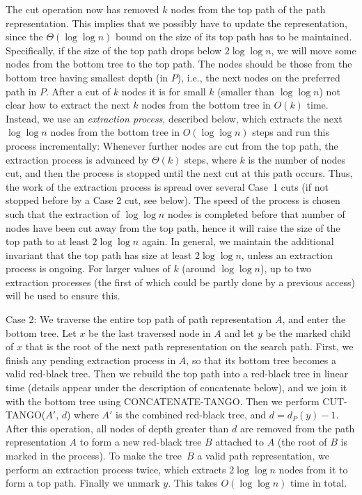 \documentclass[letterpaper,11pt]{article}
\newcommand{\toppath}{top path}
\newcommand{\bottomtree}{bottom tree}
\newcounter{todo}
\newcommand{\todo}[1]{}
\begin{document}
The cut operation now has removed $k$ nodes from the \toppath{} of the path
representation. This implies that we possibly have to update the
representation, since the $\Theta(\log \log n)$ bound on the size of its
\toppath{} has to be maintained. Specifically, if the size of the top path
drops below $2 \log\log n$, we will move some nodes from the \bottomtree{}
to the \toppath{}. The nodes should be those from the \bottomtree{} having
smallest depth (in $P$), i.e., the next nodes on the preferred path in
$P$. After a cut of $k$ nodes it is for small $k$ (smaller than $\log\log
n$) not clear how to extract the next $k$ nodes from the \bottomtree{} in
$O(k)$ time. Instead, we use an \emph{extraction process}, described below,
which extracts the next $\log \log n$ nodes from the \bottomtree{} in
$O(\log \log n)$ steps and run this process incrementally: Whenever further
nodes are cut from the \toppath{}, the extraction process is advanced by
$\Theta(k)$ steps, where $k$ is the number of nodes cut, and then the
process is stopped until the next cut at this path occurs. Thus, the work
of the extraction process is spread over several Case~1 cuts (if not
stopped before by a Case 2 cut, see below). The speed of the process is
chosen such that the extraction of $\log \log n$ nodes is completed before
that number of nodes have been cut away from the \toppath, hence it will
raise the size of the \toppath{} to at least $2 \log\log n$ again. In
general, we maintain the additional invariant that the \toppath{} has size
at least $2 \log\log n$, unless an extraction process is ongoing. For
larger values of $k$ (around $\log\log n$), up to two extraction processes
(the first of which could be partly done by a previous access) will be used
to ensure this.

Case 2: We traverse the entire \toppath{} of path representation $A$, and
enter the \bottomtree{}. Let $x$ be the last traversed node in $A$ and let
$y$ be the marked child of $x$ that is the root of the next path
representation on the search path. First, we finish any pending extraction
process in $A$, so that its \bottomtree{} becomes a valid red-black
tree.\todo{This could move $x$ onto the top path, which does not seem
anticipated by the existing phrasing. Hence the changed phrasing. Has
implications for concatenate, see Todo below. Rolf.} Then we rebuild the
\toppath{} into a red-black tree in linear time (details appear under the
description of concatenate below), and we join it with the \bottomtree{}
using C{\scriptsize ONCATENATE}-T{\scriptsize ANGO}.  Then we perform
C{\scriptsize UT}-T{\scriptsize ANGO}($A'$, $d$) where $A'$ is the combined
red-black tree, and $d=d_P(y)-1$. After this operation, all nodes of depth
greater than $d$ are removed from the path representation $A$ to form a new
red-black tree $B$ attached to $A$ (the root of $B$ is marked in the
process). To make the tree~$B$ a valid path representation, we perform an
extraction process twice, which extracts $2\log \log n$ nodes from it to
form a \toppath. Finally we unmark $y$. This takes $O(\log \log n)$ time in
total.
\end{document}
